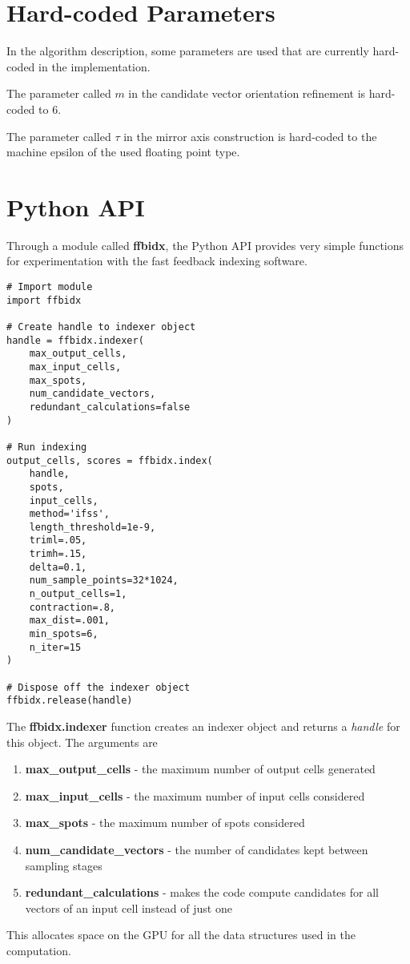 \documentclass[a4paper,10pt]{article}
\begin{document}
\section{Hard-coded Parameters}

In the algorithm description, some parameters are used that are currently hard-coded in the implementation.

The parameter called $m$ in the candidate vector orientation refinement is hard-coded to 6.

The parameter called $\tau$ in the mirror axis construction is hard-coded to the machine epsilon of the used floating point type.

\section{Python API}
\lstset{language=Python}

Through a module called \textbf{ffbidx}, the Python API provides very simple functions for experimentation with the fast feedback indexing software.

\begin{lstlisting}
# Import module
import ffbidx

# Create handle to indexer object
handle = ffbidx.indexer(
    max_output_cells,
    max_input_cells,
    max_spots,
    num_candidate_vectors,
    redundant_calculations=false
)

# Run indexing
output_cells, scores = ffbidx.index(
    handle,
    spots,
    input_cells,
    method='ifss',
    length_threshold=1e-9,
    triml=.05,
    trimh=.15,
    delta=0.1,
    num_sample_points=32*1024,
    n_output_cells=1,
    contraction=.8,
    max_dist=.001,
    min_spots=6,
    n_iter=15
)

# Dispose off the indexer object
ffbidx.release(handle)
\end{lstlisting}
%
The \textbf{ffbidx.indexer} function creates an indexer object and returns a \emph{handle} for this object. The arguments are
%
\begin{enumerate}
 \item \textbf{max\_output\_cells} - the maximum number of output cells generated
 \item \textbf{max\_input\_cells} - the maximum number of input cells considered
 \item \textbf{max\_spots} - the maximum number of spots considered
 \item \textbf{num\_candidate\_vectors} - the number of candidates kept between sampling stages
 \item \textbf{redundant\_calculations} - makes the code compute candidates for all vectors of an input cell instead of just one
\end{enumerate}
%
This allocates space on the GPU for all the data structures used in the computation.
\end{document}
